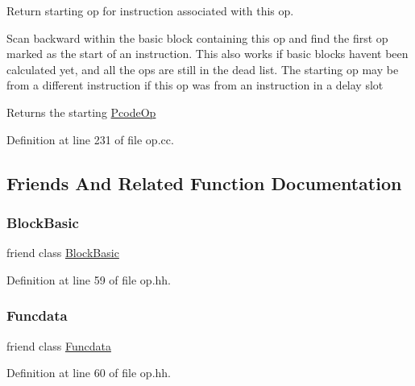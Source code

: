 Return starting op for instruction associated with this op. 

Scan backward within the basic block containing this op and find the first op marked as the start of an instruction. This also works if basic blocks haven\textquotesingle{}t been calculated yet, and all the ops are still in the dead list. The starting op may be from a different instruction if this op was from an instruction in a delay slot \begin{DoxyReturn}{Returns}
the starting \mbox{\hyperlink{class_pcode_op}{Pcode\+Op}} 
\end{DoxyReturn}


Definition at line 231 of file op.\+cc.



\subsection{Friends And Related Function Documentation}
\mbox{\label{class_pcode_op_a5d6670c2799e57561e4b5a6f31202633}} 
\subsubsection{\texorpdfstring{BlockBasic}{BlockBasic}}
{\footnotesize\ttfamily friend class \mbox{\hyperlink{class_block_basic}{Block\+Basic}}\hspace{0.3cm}{\ttfamily [friend]}}



Definition at line 59 of file op.\+hh.

\mbox{\label{class_pcode_op_a16ade990887167c11c41cb88121bb449}} 
\subsubsection{\texorpdfstring{Funcdata}{Funcdata}}
{\footnotesize\ttfamily friend class \mbox{\hyperlink{class_funcdata}{Funcdata}}\hspace{0.3cm}{\ttfamily [friend]}}



Definition at line 60 of file op.\+hh.

\mbox{\label{class_pcode_op_a9b0cf6f80beddec0b9f7745c87c22ba7}} 

